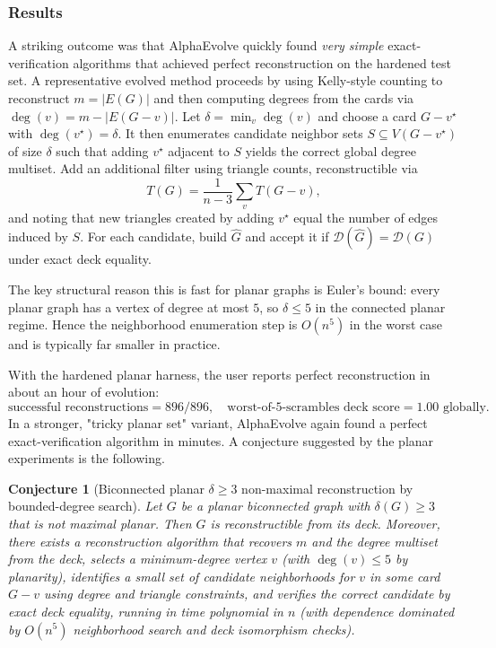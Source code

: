 \documentclass[11pt]{amsart}
\newtheorem{conjecture}{Conjecture}
\begin{document}
\subsubsection{Results}
A striking outcome was that AlphaEvolve quickly found \emph{very simple} exact-verification algorithms that achieved perfect reconstruction on the hardened test set.
A representative evolved method proceeds by using Kelly-style counting to reconstruct $m=|E(G)|$ and then computing degrees from the cards via $\deg(v)=m-|E(G-v)|$. Let $\delta=\min_v \deg(v)$ and choose a card $G-v^\star$ with $\deg(v^\star)=\delta$. It then enumerates candidate neighbor sets $S\subseteq V(G-v^\star)$ of size $\delta$ such that adding $v^\star$ adjacent to $S$ yields the correct global degree multiset. Add an additional filter using triangle counts, reconstructible via
\[
T(G)=\frac{1}{n-3}\sum_{v} T(G-v),
\]
and noting that new triangles created by adding $v^\star$ equal the number of edges induced by $S$. For each candidate, build $\widehat{G}$ and accept it if $\mathcal{D}(\widehat{G})=\mathcal{D}(G)$ under exact deck equality.

The key structural reason this is fast for planar graphs is Euler's bound: every planar graph has a vertex of degree at most $5$, so $\delta\le 5$ in the connected planar regime. Hence the neighborhood enumeration step is $O(n^5)$ in the worst case and is typically far smaller in practice.

With the hardened planar harness, the user reports perfect reconstruction in about an hour of evolution:
\[
\text{successful reconstructions} = 896/896,\quad
\text{worst-of-5-scrambles deck score}=1.00\text{ globally}.
\]
In a stronger, "tricky planar set" variant, AlphaEvolve again found a perfect exact-verification algorithm in minutes.
A conjecture suggested by the planar experiments is the following. 

\begin{conjecture}[Biconnected planar $\delta\ge 3$ non-maximal reconstruction by bounded-degree search]\label{conj:planar}
Let $G$ be a planar biconnected graph with $\delta(G)\ge 3$ that is not maximal planar.
Then $G$ is reconstructible from its deck.
Moreover, there exists a reconstruction algorithm that recovers $m$ and the degree multiset from the deck, selects a minimum-degree vertex $v$ (with $\deg(v)\le 5$ by planarity), identifies a small set of candidate neighborhoods for $v$ in some card $G-v$ using degree and triangle constraints, and verifies the correct candidate by exact deck equality, running in time polynomial in $n$ (with dependence dominated by $O(n^5)$ neighborhood search and deck isomorphism checks).
\end{conjecture}
\end{document}
